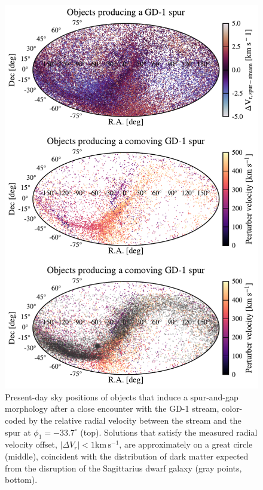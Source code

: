 \documentclass[twocolumn]{aastex63}
\newcommand{\kms}{\ensuremath{\textrm{km}\,\textrm{s}^{-1}}}
\begin{document}
\begin{figure}
\begin{center}
\includegraphics[width=0.99\columnwidth]{skybox.pdf}
\end{center}
\caption{Present-day sky positions of objects that induce a spur-and-gap morphology after a close encounter with the GD-1 stream, color-coded by the relative radial velocity between the stream and the spur at $\phi_1=-33.7^\circ$ (top).
Solutions that satisfy the measured radial velocity offset, $|\Delta V_r|<1\kms$, are approximately on a great circle (middle), coincident with the distribution of dark matter expected from the disruption of the Sagittarius dwarf galaxy (gray points, bottom).
}
\label{fig:skybox}
\end{figure}
\end{document}
